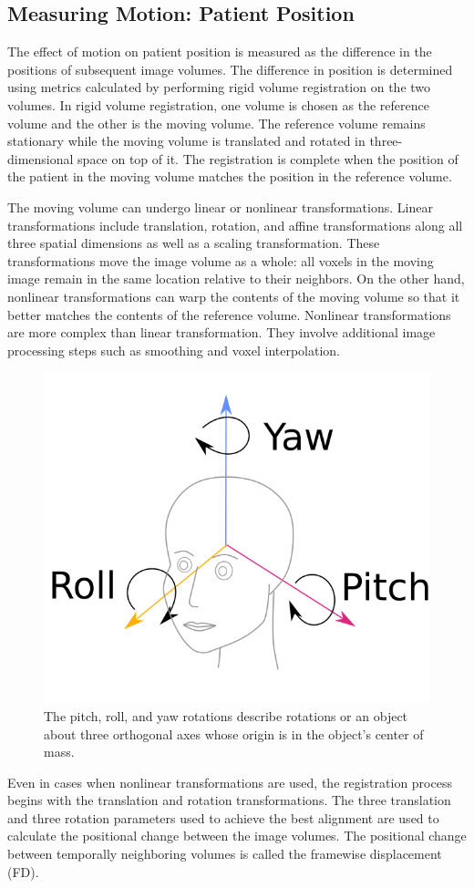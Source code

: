 \subsection{Measuring Motion: Patient Position} 

The effect of motion on patient position is measured as the difference in the positions of subsequent image volumes. The difference in position is determined using metrics calculated by performing rigid volume registration on the two volumes. 
In rigid volume registration, one volume is chosen as the reference volume and the other is the moving volume. The reference volume remains stationary while the moving volume is translated and rotated in three-dimensional space on top of it. The registration is complete when the position of the patient in the moving volume matches the position in the reference volume. 

The moving volume can undergo linear or nonlinear transformations. Linear transformations include translation, rotation, and affine transformations along all three spatial dimensions as well as a scaling transformation. These transformations move the image volume as a whole: all voxels in the moving image remain in the same location relative to their neighbors. On the other hand, nonlinear transformations can warp the contents of the moving volume so that it better matches the contents of the reference volume. Nonlinear transformations are more complex than linear transformation. They involve additional image processing steps such as smoothing and voxel interpolation.

\begin{figure}
\centering
\includegraphics[width=.5\textwidth]{2/pitch_roll_yaw.png}
\caption{The pitch, roll, and yaw rotations describe rotations or an object about three orthogonal axes whose origin is in the object's center of mass.}
\label{fig:pry}
\end{figure} 

Even in cases when nonlinear transformations are used, the registration process begins with the translation and rotation transformations. The three translation and three rotation parameters used to achieve the best alignment are used to calculate the positional change between the image volumes. The positional change between temporally neighboring volumes is called the framewise displacement (FD).  

